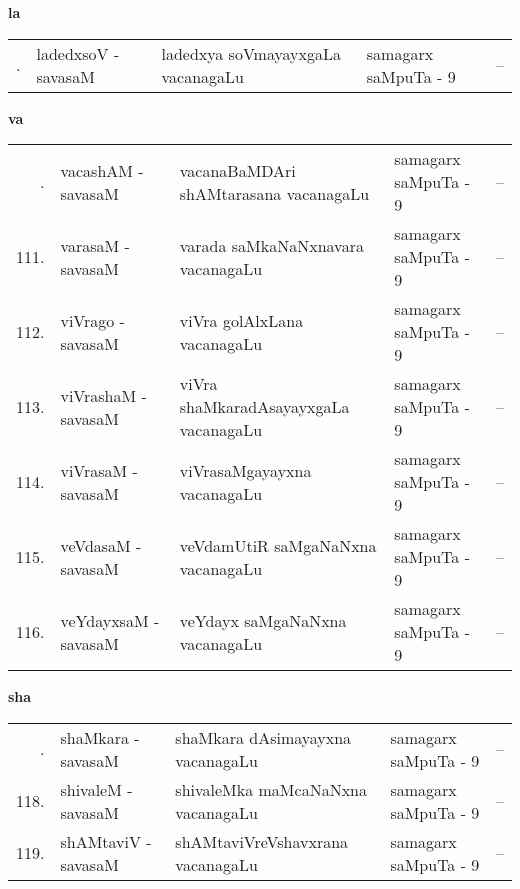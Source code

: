 \medskip

\centerline{\bf la}

{\renewcommand{\arraystretch}{1.3}
\begin{longtable}{rl>{\raggedright}p{5.5cm}lc}
\endfirsthead
\endhead
\endfoot
\endlastfoot
109. &  ladedxsoV - savasaM &  ladedxya soVmayayxgaLa vacanagaLu & samagarx saMpuTa - 9 & --\\
\end{longtable}}
\smallskip

\centerline{\bf va}

{\renewcommand{\arraystretch}{1.3}
\begin{longtable}{rl>{\raggedright}p{5.5cm}lc}
\endfirsthead
\endhead
\endfoot
\endlastfoot
110. &  vacashAM - savasaM & vacanaBaMDAri shAMtarasana vacanagaLu & samagarx saMpuTa - 9 & --\\
111. &  varasaM - savasaM &  varada saMkaNaNxnavara vacanagaLu & samagarx saMpuTa - 9 & --\\
112. &  viVrago - savasaM &  viVra golAlxLana vacanagaLu & samagarx saMpuTa - 9 & --\\
113. & viVrashaM - savasaM &  viVra shaMkaradAsayayxgaLa vacanagaLu & samagarx saMpuTa - 9 & --\\
114. & viVrasaM - savasaM & viVrasaMgayayxna vacanagaLu & samagarx saMpuTa - 9 & --\\
115. & veVdasaM - savasaM &  veVdamUtiR saMgaNaNxna vacanagaLu & samagarx saMpuTa - 9 & --\\
116. & veYdayxsaM - savasaM &  veYdayx saMgaNaNxna vacanagaLu & samagarx saMpuTa - 9 & --\\
\end{longtable}}
\smallskip

\centerline{\bf sha}

{\renewcommand{\arraystretch}{1.3}
\begin{longtable}{rl>{\raggedright}p{5.5cm}lc}
\endfirsthead
\endhead
\endfoot
\endlastfoot
117. & shaMkara - savasaM &  shaMkara dAsimayayxna vacanagaLu & samagarx saMpuTa - 9 & --\\
118. & shivaleM - savasaM &  shivaleMka maMcaNaNxna vacanagaLu & samagarx saMpuTa - 9 & --\\
119. & shAMtaviV - savasaM & shAMtaviVreVshavxrana vacanagaLu & samagarx saMpuTa - 9 & --\\
\end{longtable}}
\smallskip

